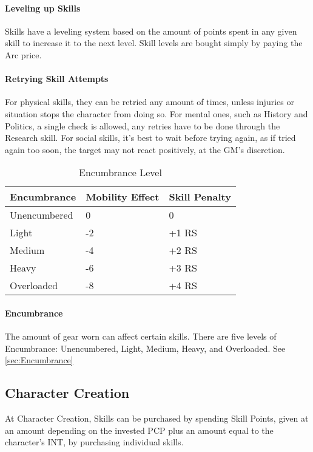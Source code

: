 \documentclass[oneside,11pt,english]{book}
\begin{document}
\paragraph{Leveling up Skills} Skills have a leveling system based on the amount of points spent in any given skill to increase it to the next level. Skill levels are bought simply by paying the Arc price.
\paragraph{Retrying Skill Attempts} For physical skills, they can be retried any amount of times, unless injuries or situation stops the character from doing so. For mental ones, such as History and Politics, a single check is allowed, any retries have to be done through the Research skill. For social skills, it’s best to wait before trying again, as if tried again too soon, the target may not react positively, at the GM’s discretion.

\setlength{\intextsep}{0pt}
\vspace{-5pt}\begin{wraptable}{r}{8 cm}
	\centering
	\caption{Encumbrance Level}
	\label{tab:Encumbrance Penalties}
	\begin{tabu} spread 0pt{XX[c]X[r]}
		Encumbrance		&Mobility Effect&Skill Penalty\\\toprule
		Unencumbered	&0				&0\\
		Light			&-2				&+1 RS\\
		Medium			&-4				&+2 RS\\
		Heavy			&-6				&+3 RS\\
		Overloaded		&-8				&+4 RS\\
	\end{tabu}
\end{wraptable}
\setlength{\intextsep}{\oldintextsep}

\paragraph{Encumbrance} The amount of gear worn can affect certain skills. There are five levels of Encumbrance: Unencumbered, Light, Medium, Heavy, and Overloaded. See \autoref{sec:Encumbrance}

\subsection{Character Creation}
At Character Creation, Skills can be purchased by spending Skill Points, given at an amount depending on the invested PCP plus an amount equal to the character’s INT, by purchasing individual skills.
\end{document}
